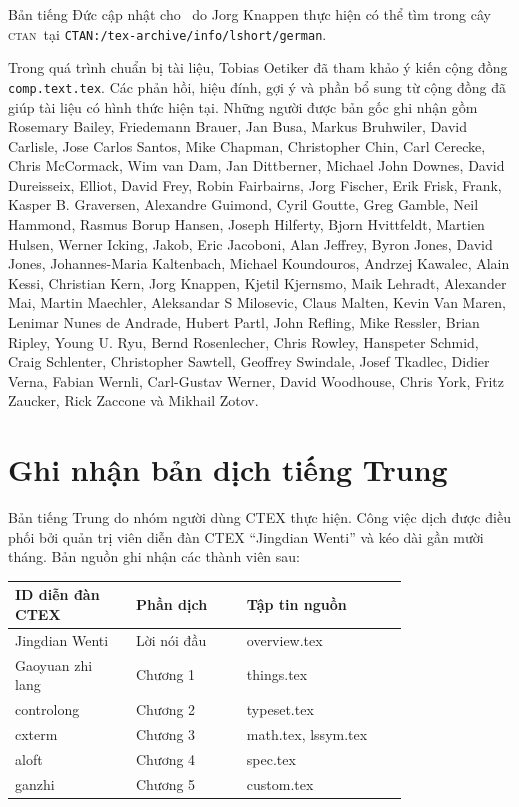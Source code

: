 \documentclass[11pt]{article}
\newcommand{\CTAN}{\textsc{ctan}}
\newcommand{\file}[1]{\texttt{#1}}
\begin{document}
Bản tiếng Đức cập nhật cho \LaTeXe\ do Jorg Knappen thực hiện có thể tìm trong
cây \CTAN\ tại \file{CTAN:/tex-archive/info/lshort/german}.

Trong quá trình chuẩn bị tài liệu, Tobias Oetiker đã tham khảo ý kiến cộng
đồng \texttt{comp.text.tex}. Các phản hồi, hiệu đính, gợi ý và phần bổ sung
từ cộng đồng đã giúp tài liệu có hình thức hiện tại. Những người được bản gốc
ghi nhận gồm Rosemary Bailey, Friedemann Brauer, Jan Busa, Markus Bruhwiler,
David Carlisle, Jose Carlos Santos, Mike Chapman, Christopher Chin, Carl
Cerecke, Chris McCormack, Wim van Dam, Jan Dittberner, Michael John Downes,
David Dureisseix, Elliot, David Frey, Robin Fairbairns, Jorg Fischer, Erik
Frisk, Frank, Kasper B. Graversen, Alexandre Guimond, Cyril Goutte, Greg
Gamble, Neil Hammond, Rasmus Borup Hansen, Joseph Hilferty, Bjorn Hvittfeldt,
Martien Hulsen, Werner Icking, Jakob, Eric Jacoboni, Alan Jeffrey, Byron
Jones, David Jones, Johannes-Maria Kaltenbach, Michael Koundouros, Andrzej
Kawalec, Alain Kessi, Christian Kern, Jorg Knappen, Kjetil Kjernsmo, Maik
Lehradt, Alexander Mai, Martin Maechler, Aleksandar S Milosevic, Claus Malten,
Kevin Van Maren, Lenimar Nunes de Andrade, Hubert Partl, John Refling, Mike
Ressler, Brian Ripley, Young U. Ryu, Bernd Rosenlecher, Chris Rowley,
Hanspeter Schmid, Craig Schlenter, Christopher Sawtell, Geoffrey Swindale,
Josef Tkadlec, Didier Verna, Fabian Wernli, Carl-Gustav Werner, David
Woodhouse, Chris York, Fritz Zaucker, Rick Zaccone và Mikhail Zotov.

\section*{Ghi nhận bản dịch tiếng Trung}

Bản tiếng Trung do nhóm người dùng CTEX thực hiện. Công việc dịch được điều
phối bởi quản trị viên diễn đàn CTEX ``Jingdian Wenti'' và kéo dài gần mười
tháng. Bản nguồn ghi nhận các thành viên sau:

\begin{center}
\begin{tabular}{>{\ttfamily}p{0.24\linewidth}p{0.22\linewidth}p{0.32\linewidth}}
\textnormal{ID diễn đàn CTEX} & \textnormal{Phần dịch} & \textnormal{Tập tin nguồn}\\
\hline
Jingdian Wenti & Lời nói đầu & overview.tex\\
Gaoyuan zhi lang & Chương 1 & things.tex\\
controlong & Chương 2 & typeset.tex\\
cxterm & Chương 3 & math.tex, lssym.tex\\
aloft & Chương 4 & spec.tex\\
ganzhi & Chương 5 & custom.tex
\end{tabular}
\end{center}
\end{document}
